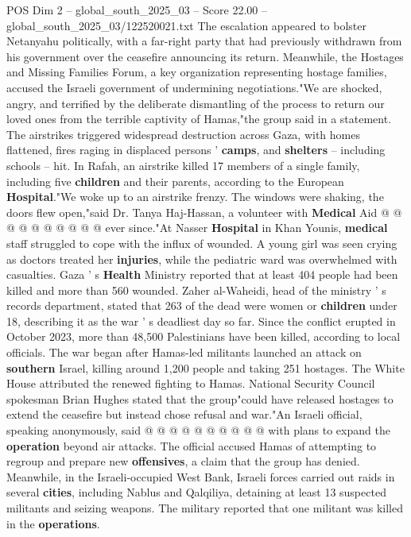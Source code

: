 \begin{textsample}{POS Dim 2 – global\_south\_2025\_03 – Score 22.00 – global\_south\_2025\_03/122520021.txt}
The escalation appeared to bolster Netanyahu politically, with a far-right party that had previously withdrawn from his government over the ceasefire announcing its return.
Meanwhile, the Hostages and Missing Families Forum, a key organization representing hostage families, accused the Israeli government of undermining negotiations."We are shocked, angry, and terrified by the deliberate dismantling of the process to return our loved ones from the terrible captivity of Hamas,"the group said in a statement.
The airstrikes triggered widespread destruction across Gaza, with homes flattened, fires raging in displaced persons ' \textbf{camps}, and \textbf{shelters} -- including schools -- hit.
In Rafah, an airstrike killed 17 members of a single family, including five \textbf{children} and their parents, according to the European \textbf{Hospital}."We woke up to an airstrike frenzy.
The windows were shaking, the doors flew open,"said Dr.
Tanya Haj-Hassan, a volunteer with \textbf{Medical} Aid @ @ @ @ @ @ @ @ @ @ ever since."At Nasser \textbf{Hospital} in Khan Younis, \textbf{medical} staff struggled to cope with the influx of wounded.
A young girl was seen crying as doctors treated her \textbf{injuries}, while the pediatric ward was overwhelmed with casualties.
Gaza ' s \textbf{Health} Ministry reported that at least 404 people had been killed and more than 560 wounded.
Zaher al-Waheidi, head of the ministry ' s records department, stated that 263 of the dead were women or \textbf{children} under 18, describing it as the war ' s deadliest day so far.
Since the conflict erupted in October 2023, more than 48,500 Palestinians have been killed, according to local officials.
The war began after Hamas-led militants launched an attack on \textbf{southern} Israel, killing around 1,200 people and taking 251 hostages.
The White House attributed the renewed fighting to Hamas.
National Security Council spokesman Brian Hughes stated that the group"could have released hostages to extend the ceasefire but instead chose refusal and war."An Israeli official, speaking anonymously, said @ @ @ @ @ @ @ @ @ @ with plans to expand the \textbf{operation} beyond air attacks.
The official accused Hamas of attempting to regroup and prepare new \textbf{offensives}, a claim that the group has denied.
Meanwhile, in the Israeli-occupied West Bank, Israeli forces carried out raids in several \textbf{cities}, including Nablus and Qalqiliya, detaining at least 13 suspected militants and seizing weapons.
The military reported that one militant was killed in the \textbf{operations}.

\end{textsample}
